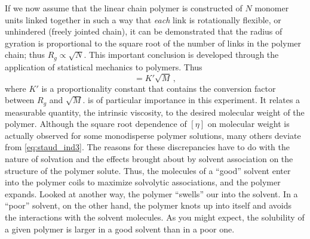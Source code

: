 \documentclass[nobib,nofonts,nols,nohyper]{tufte-handout}
\begin{document}
If we now assume that the linear chain polymer is constructed of \( N \) monomer units linked together in such a way that \emph{each} link is rotationally flexible, or unhindered (freely jointed chain), it can be demonstrated that the radius of gyration is proportional to the square root of the number of links in the polymer chain; thus \( R_g \propto \sqrt{N} \). 
This important conclusion is developed through the application of statistical mechanics to polymers.\autocite{halpern97} Thus
\begin{equation}
	[\eta] = K' \sqrt{M} \, ,
	\label{eq:staud_ind3}
\end{equation}
where \( K' \) is a proportionality constant that contains the conversion factor between \( R_g \) and \( \sqrt{M} \). 
 is of particular importance in this experiment. 
It relates a measurable quantity, the intrinsic viscosity, to the desired molecular weight of the polymer. Although the square root dependence of \( [\eta] \) on molecular weight is actually observed for some monodisperse polymer solutions, many others deviate from \cref{eq:staud_ind3}. 
The reasons for these discrepancies have to do with the nature of solvation and the effects brought about by solvent association on the structure of the polymer solute. 
Thus, the molecules of a ``good'' solvent enter into the polymer coils to maximize solvolytic associations, and the polymer expands. 
Looked at another way, the polymer ``swells'' our into the solvent. 
In a ``poor'' solvent, on the other hand, the polymer knots up into itself and avoids the interactions with the solvent molecules. 
As you might expect, the solubility of a given polymer is larger in a good solvent than in a poor one. 
\end{document}

